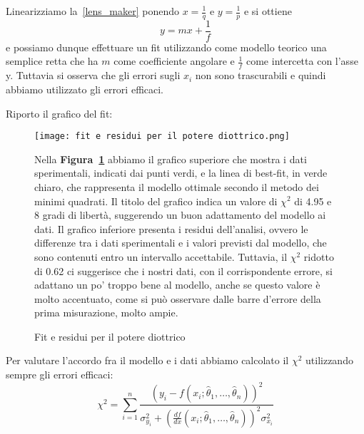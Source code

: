 \documentclass{article}
\begin{document}
Linearizziamo la~\eqref{lens_maker} ponendo $x = \frac{1}{q}$ e $y=\frac{1}{p}$ e si ottiene
\begin{equation}
y = mx + \frac{1}{f}
\end{equation}
e possiamo dunque effettuare un fit utilizzando come modello teorico una semplice retta che ha $m$ come coefficiente angolare e $\frac{1}{f}$ come intercetta con l'asse y. Tuttavia si osserva che gli errori sugli $x_i$ non sono trascurabili e quindi abbiamo utilizzato gli errori efficaci.

Riporto il grafico del fit:

\begin{figure}[htbp]
\begin{minipage}{0.55\textwidth}
\centering
\texttt{[image: fit e residui per il potere diottrico.png]}
\caption{Fit e residui per il potere diottrico}
\label{fig:f.d}
\end{minipage}
\hfill
\begin{minipage}{0.40\textwidth}
Nella \textbf{Figura~\ref{fig:f.d}} abbiamo il grafico superiore che mostra i dati sperimentali, indicati dai punti verdi, e la linea di best-fit, in verde chiaro, che rappresenta il modello ottimale secondo il metodo dei minimi quadrati. Il titolo del grafico indica un valore di \( \chi^2 \) di 4.95 e 8 gradi di libertà, suggerendo un buon adattamento del modello ai dati. Il grafico inferiore presenta i residui dell'analisi, ovvero le differenze tra i dati sperimentali e i valori previsti dal modello, che sono contenuti entro un intervallo accettabile. Tuttavia, il \( \chi^2 \) ridotto di 0.62 ci suggerisce che i nostri dati, con il corrispondente errore, si adattano un po' troppo bene al modello, anche se questo valore è molto accentuato, come si può osservare dalle barre d'errore della prima misurazione, molto ampie.
\end{minipage}
\end{figure}

Per valutare l'accordo fra il modello e i dati abbiamo calcolato il $\chi^2$ utilizzando sempre gli errori efficaci:
\begin{equation}
\chi^2 = \sum_{i=1}^n \frac{(y_i - f(x_i; \hat{\theta}_1, \ldots, \hat{\theta}_n))^2}{\sigma_{y_i}^2 + \left(\frac{df}{dx}(x_i; \hat{\theta}_1, \ldots, \hat{\theta}_n)\right)^2 \sigma_{x_i}^2}
\end{equation}

\pagebreak
\end{document}

